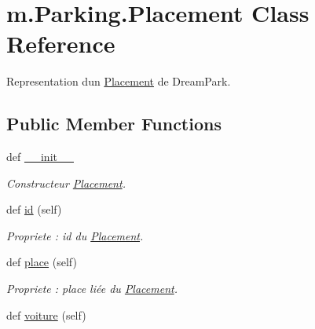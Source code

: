 \hypertarget{classm_1_1_parking_1_1_placement}{}\section{m.\+Parking.\+Placement Class Reference}
\label{classm_1_1_parking_1_1_placement}


Representation d\textquotesingle{}un \hyperlink{classm_1_1_parking_1_1_placement}{Placement} de Dream\+Park.  


\subsection*{Public Member Functions}
\begin{DoxyCompactItemize}
\item 
def \hyperlink{classm_1_1_parking_1_1_placement_aac891cdf604c43197768641ac05325d9}{\+\_\+\+\_\+init\+\_\+\+\_\+}
\begin{DoxyCompactList}\small\item\em Constructeur \hyperlink{classm_1_1_parking_1_1_placement}{Placement}. \end{DoxyCompactList}\item 
\hypertarget{classm_1_1_parking_1_1_placement_a17f15325f5065b5b057b0b23d430bcf7}{}def \hyperlink{classm_1_1_parking_1_1_placement_a17f15325f5065b5b057b0b23d430bcf7}{id} (self)\label{classm_1_1_parking_1_1_placement_a17f15325f5065b5b057b0b23d430bcf7}

\begin{DoxyCompactList}\small\item\em Propriete \+: id du \hyperlink{classm_1_1_parking_1_1_placement}{Placement}. \end{DoxyCompactList}\item 
\hypertarget{classm_1_1_parking_1_1_placement_ada84e90de0799ca0c1474c72615df286}{}def \hyperlink{classm_1_1_parking_1_1_placement_ada84e90de0799ca0c1474c72615df286}{place} (self)\label{classm_1_1_parking_1_1_placement_ada84e90de0799ca0c1474c72615df286}

\begin{DoxyCompactList}\small\item\em Propriete \+: place liée du \hyperlink{classm_1_1_parking_1_1_placement}{Placement}. \end{DoxyCompactList}\item 
\hypertarget{classm_1_1_parking_1_1_placement_ae8905ba5b9db21c9c91b7f4b4cf8277a}{}def \hyperlink{classm_1_1_parking_1_1_placement_ae8905ba5b9db21c9c91b7f4b4cf8277a}{voiture} (self)\label{classm_1_1_parking_1_1_placement_ae8905ba5b9db21c9c91b7f4b4cf8277a}


\end{DoxyCompactItemize}
